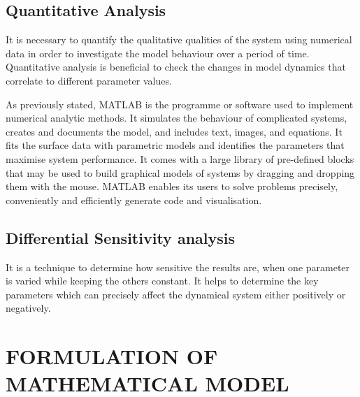 \documentclass[12pt,a4wide]{report}
\numberwithin{equation}{chapter}
\numberwithin{theorem}{chapter}
\begin{document}
\section{Quantitative Analysis}

It is necessary to quantify the qualitative qualities of the system using numerical data in order to investigate the model behaviour over a period of time. Quantitative analysis is beneficial to check the changes in model dynamics that correlate to different parameter values.

 As previously stated, MATLAB is the programme or software used to implement numerical analytic methods. It simulates the behaviour of complicated systems, creates and documents the model, and includes text, images, and equations. It fits the surface data with parametric models and identifies the parameters that maximise system performance. It comes with a large library of pre-defined blocks that may be used to build graphical models of systems by dragging and dropping them with the mouse. MATLAB enables its users to solve problems precisely, conveniently and efficiently generate code and visualisation.
 
\section{Differential Sensitivity analysis}
It is a technique to determine how sensitive the results are, when one parameter is varied while keeping the others constant. It helps to determine the key parameters which can precisely affect the dynamical system either positively or negatively.\\




%
\chapter[FORMULATION OF MATHEMATICAL MODEL]{FORMULATION OF MATHEMATICAL MODEL} %
\vspace{-1cm}
\end{document}
